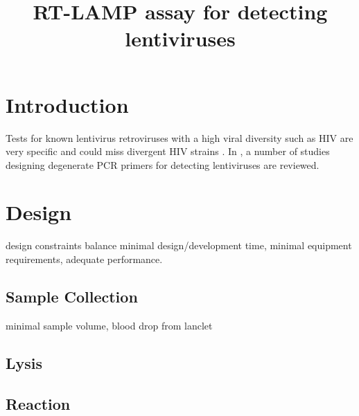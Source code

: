 \documentclass{article}
\title{RT-LAMP assay for detecting lentiviruses}
\begin{document}
\maketitle

\section{Introduction}

Tests for known lentivirus retroviruses with a high viral diversity such as HIV are very specific and could miss divergent HIV strains \cite{bartolo2012hiv}\cite{luft2011hiv}. In \cite{voisset2008human}, a number of studies designing degenerate PCR primers for detecting lentiviruses are reviewed.


\section{Design}

design constraints balance minimal design/development time, minimal equipment requirements, adequate performance.

\subsection{Sample Collection}

minimal sample volume, blood drop from lanclet 

\subsection{Lysis}

\cite{curtis2008rapid}

\subsection{Reaction}





\end{document}
